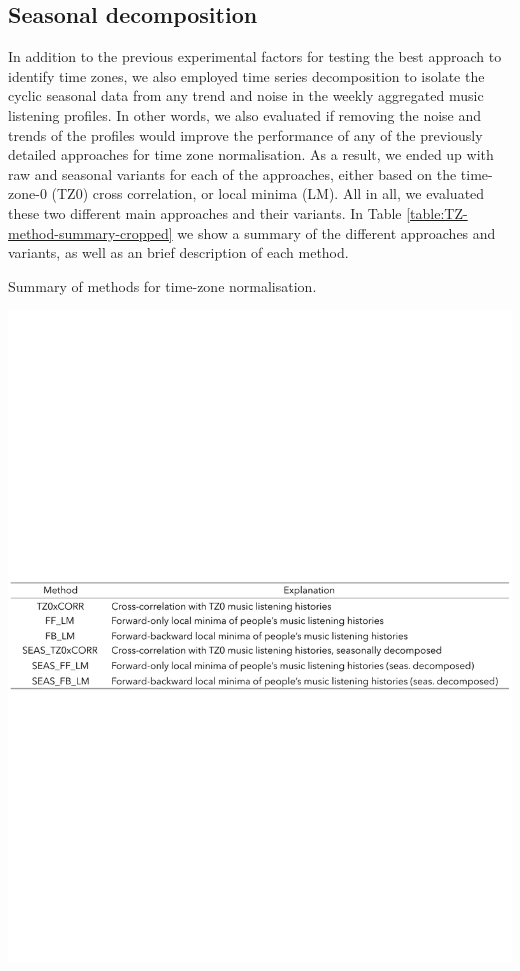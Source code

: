 \subsection{Seasonal decomposition}
In addition to the previous experimental factors for testing the best approach to identify time zones, we also employed time series decomposition to isolate the cyclic seasonal data from any trend and noise in the weekly aggregated music listening profiles. 
In other words, we also evaluated if removing the noise and trends of the profiles would improve the performance of any of the previously detailed approaches for time zone normalisation.
As a result, we ended up with raw and seasonal variants for each of the approaches, either based on the time-zone-0 (TZ0) cross correlation, or local minima (LM). All in all, we evaluated these two different main approaches and their variants.
In Table \ref{table:TZ-method-summary-cropped} we show a summary of the different approaches and variants, as well as an brief description of each method.

\begin{table}[!h]
\centering
\caption{Summary of methods for time-zone normalisation.}\label{table:TZ-method-summary-cropped}
\includegraphics[width = 1.00\textwidth]{TZ-method-summary-cropped.pdf}
\end{table}


